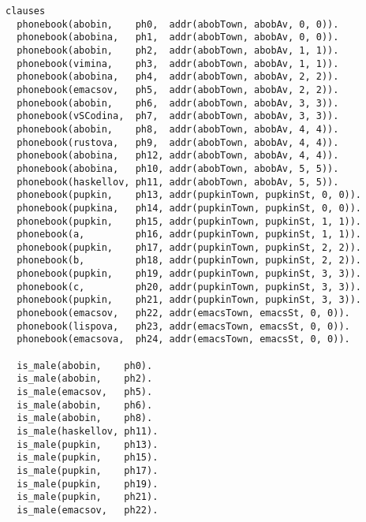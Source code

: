 \documentclass[a4paper,oneside,14pt]{extarticle}
\begin{document}
\begin{lstlisting}
clauses
  phonebook(abobin,    ph0,  addr(abobTown, abobAv, 0, 0)).
  phonebook(abobina,   ph1,  addr(abobTown, abobAv, 0, 0)).
  phonebook(abobin,    ph2,  addr(abobTown, abobAv, 1, 1)).
  phonebook(vimina,    ph3,  addr(abobTown, abobAv, 1, 1)).
  phonebook(abobina,   ph4,  addr(abobTown, abobAv, 2, 2)).
  phonebook(emacsov,   ph5,  addr(abobTown, abobAv, 2, 2)).
  phonebook(abobin,    ph6,  addr(abobTown, abobAv, 3, 3)).
  phonebook(vSCodina,  ph7,  addr(abobTown, abobAv, 3, 3)).
  phonebook(abobin,    ph8,  addr(abobTown, abobAv, 4, 4)).
  phonebook(rustova,   ph9,  addr(abobTown, abobAv, 4, 4)).
  phonebook(abobina,   ph12, addr(abobTown, abobAv, 4, 4)).
  phonebook(abobina,   ph10, addr(abobTown, abobAv, 5, 5)).
  phonebook(haskellov, ph11, addr(abobTown, abobAv, 5, 5)).
  phonebook(pupkin,    ph13, addr(pupkinTown, pupkinSt, 0, 0)).
  phonebook(pupkina,   ph14, addr(pupkinTown, pupkinSt, 0, 0)).
  phonebook(pupkin,    ph15, addr(pupkinTown, pupkinSt, 1, 1)).
  phonebook(a,         ph16, addr(pupkinTown, pupkinSt, 1, 1)).
  phonebook(pupkin,    ph17, addr(pupkinTown, pupkinSt, 2, 2)).
  phonebook(b,         ph18, addr(pupkinTown, pupkinSt, 2, 2)).
  phonebook(pupkin,    ph19, addr(pupkinTown, pupkinSt, 3, 3)).
  phonebook(c,         ph20, addr(pupkinTown, pupkinSt, 3, 3)).
  phonebook(pupkin,    ph21, addr(pupkinTown, pupkinSt, 3, 3)).
  phonebook(emacsov,   ph22, addr(emacsTown, emacsSt, 0, 0)).
  phonebook(lispova,   ph23, addr(emacsTown, emacsSt, 0, 0)).
  phonebook(emacsova,  ph24, addr(emacsTown, emacsSt, 0, 0)).

  is_male(abobin,    ph0).
  is_male(abobin,    ph2).
  is_male(emacsov,   ph5).
  is_male(abobin,    ph6).
  is_male(abobin,    ph8).
  is_male(haskellov, ph11).
  is_male(pupkin,    ph13).
  is_male(pupkin,    ph15).
  is_male(pupkin,    ph17).
  is_male(pupkin,    ph19).
  is_male(pupkin,    ph21).
  is_male(emacsov,   ph22).


\end{lstlisting}
\end{document}
